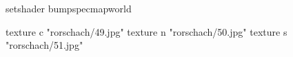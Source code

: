 setshader bumpspecmapworld

    texture c "rorschach/49.jpg"
    texture n "rorschach/50.jpg"
    texture s "rorschach/51.jpg"
